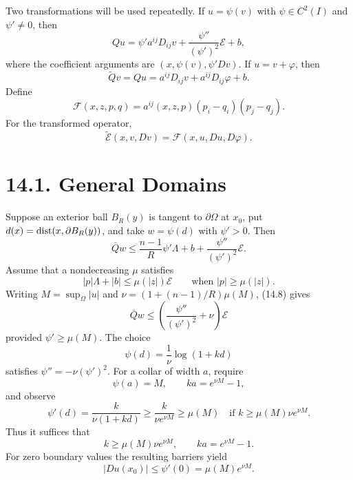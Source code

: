 Two transformations will be used repeatedly. If $u=\psi(v)$ with
$\psi\in C^2(I)$ and $\psi'\neq0$, then
\begin{equation}
Qu=\psi'a^{ij}D_{ij}v+\frac{\psi''}{(\psi')^2}\mathcal E+b,
\tag{14.4}
\end{equation}
where the coefficient arguments are $(x,\psi(v),\psi'Dv)$. If
$u=v+\varphi$, then
\begin{equation}
\widetilde Qv=Qu=a^{ij}D_{ij}v+a^{ij}D_{ij}\varphi+b.
\tag{14.5}
\end{equation}
Define
\begin{equation}
\mathcal F(x,z,p,q)=a^{ij}(x,z,p)(p_i-q_i)(p_j-q_j).
\tag{14.6}
\end{equation}
For the transformed operator,
\begin{equation}
\widetilde{\mathcal E}(x,v,Dv)=\mathcal F(x,u,Du,D\varphi).
\tag{14.7}
\end{equation}

\section*{14.1. General Domains}

Suppose an exterior ball $B_R(y)$ is tangent to $\partial\Omega$ at $x_0$, put
$d(x)=\operatorname{dist}(x,\partial B_R(y))$, and take $w=\psi(d)$ with $\psi'>0$. Then
\begin{equation}
\overline Qw
\leq\frac{n-1}{R}\psi'\Lambda+b
+\frac{\psi''}{(\psi')^2}\mathcal E.
\tag{14.8}
\end{equation}
Assume that a nondecreasing $\mu$ satisfies
\begin{equation}
|p|\Lambda+|b|\leq\mu(|z|)\mathcal E
\qquad\text{when }|p|\geq\mu(|z|).
\tag{14.9}
\end{equation}
Writing $M=\sup_\Omega|u|$ and
$\nu=(1+(n-1)/R)\mu(M)$, (14.8) gives
\begin{equation}
\overline Qw\leq
\left(\frac{\psi''}{(\psi')^2}+\nu\right)\mathcal E
\tag{14.10}
\end{equation}
provided $\psi'\geq\mu(M)$. The choice
\begin{equation}
\psi(d)=\frac1\nu\log(1+kd)
\tag{14.11}
\end{equation}
satisfies $\psi''=-\nu(\psi')^2$. For a collar of width $a$, require
\begin{equation}
\psi(a)=M,\qquad ka=e^{\nu M}-1,
\tag{14.12}
\end{equation}
and observe
\begin{equation}
\psi'(d)=\frac{k}{\nu(1+kd)}
\geq\frac{k}{\nu e^{\nu M}}\geq\mu(M)
\quad\text{if }k\geq\mu(M)\nu e^{\nu M}.
\tag{14.13}
\end{equation}
Thus it suffices that
\begin{equation}
k\geq\mu(M)\nu e^{\nu M},\qquad ka=e^{\nu M}-1.
\tag{14.14}
\end{equation}
For zero boundary values the resulting barriers yield
\begin{equation}
|Du(x_0)|\leq\psi'(0)=\mu(M)e^{\nu M}.
\tag{14.15}
\end{equation}

